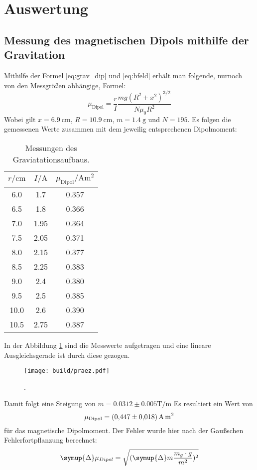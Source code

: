 \section{Auswertung}
\label{sec:Auswertung}
\subsection{Messung des magnetischen Dipols mithilfe der Gravitation}
Mithilfe der Formel \eqref{eq:grav_dip} und \eqref{eq:bfeld} erhält man folgende, nurnoch von den Messgrößen abhängige, Formel:
\begin{equation}
    \mu_\text{Dipol} = \frac{r}{I}\frac{mg\left(R^2+x^2\right)^{3/2}}{N\mu_0R^2}
\end{equation}
Wobei gilt $x=\SI{6.9}{\centi\meter}$, $R=\SI{10.9}{\centi\meter}$, $m=\SI{1.4}{\gram}$ und $N=\num{195}$.
Es folgen die gemessenen Werte zusammen mit dem jeweilig entsprechenen Dipolmoment:
%
\begin{table}[H]
\label{tab:gravtab}
    \centering
    \caption{Messungen des Graviatationsaufbaus.}
    \begin{tabular}{S[table-format=2.1(0)e0] S[table-format=1.2(0)e0] S[table-format=1.3(0)e0] }
        \toprule
        {$r/\si{\centi\meter}$} & {$I/\si{\ampere}$} & {$\mu_\text{Dipol}/\si{\ampere\meter\squared}$} \\
             & 1.7   & 0.357    \\
        6.5     & 1.8   & 0.366    \\
        7.0     & 1.95  & 0.364    \\
        7.5     & 2.05  & 0.371    \\
        8.0     & 2.15  & 0.377    \\
        8.5     & 2.25  & 0.383    \\
        9.0     & 2.4   & 0.380    \\
        9.5     & 2.5   & 0.385    \\
        10.0    & 2.6   & 0.390    \\
        10.5    & 2.75  & 0.387    \\
        \bottomrule
    \end{tabular}
\end{table}
In der Abbildung \ref{fig:grav} sind die Messwerte aufgetragen und eine lineare Ausgleichsgerade ist durch diese gezogen.
\begin{figure}[H]
  \centering
  \texttt{[image: build/praez.pdf]}
  \caption{.}
  \label{fig:grav}
\end{figure}
Damit folgt eine Steigung von $m=0.0312\pm 0.005\si{\tesla\per\meter}$
\noindent Es resultiert ein Wert von
\begin{equation*}
\mu_\text{Dipol} = \SI{0.447\pm0.018}{\ampere\meter\squared}
\end{equation*}
für das magnetische Dipolmoment.
Der Fehler wurde hier nach der Gaußschen Fehlerfortpflanzung berechnet:
\begin{equation*}
  \symup{\Delta} \mu_{Dipol} = \sqrt{(\symup{\Delta} m\frac{m_g \cdot g}{m^2})^2}
\end{equation*}

